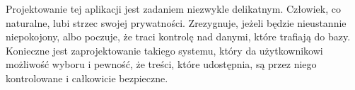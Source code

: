 Projektowanie tej aplikacji jest zadaniem niezwykle delikatnym. Człowiek, co naturalne, lubi strzec swojej prywatności. Zrezygnuje, jeżeli będzie nieustannie niepokojony, albo poczuje, że traci kontrolę nad danymi, które trafiają do bazy. Konieczne jest zaprojektowanie takiego systemu, który da użytkownikowi możliwość wyboru i pewność, że treści, które udostępnia, są przez niego kontrolowane i całkowicie bezpieczne.